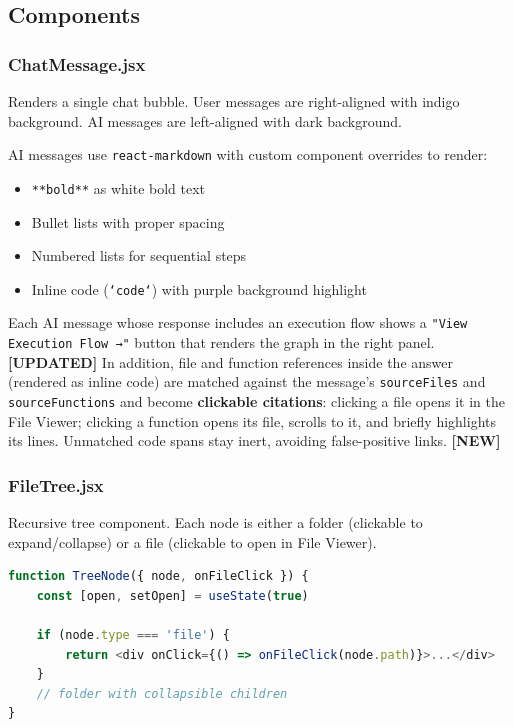 \documentclass[a4paper,11pt]{article}
\begin{document}
\subsection{Components}

\subsubsection{ChatMessage.jsx}
Renders a single chat bubble. User messages are right-aligned with indigo background. AI messages are left-aligned with dark background.

AI messages use \texttt{react-markdown} with custom component overrides to render:
\begin{itemize}
    \item \texttt{**bold**} as white bold text
    \item Bullet lists with proper spacing
    \item Numbered lists for sequential steps
    \item Inline code (\texttt{`code`}) with purple background highlight
\end{itemize}

Each AI message whose response includes an execution flow shows a \texttt{"View Execution Flow →"} button that renders the graph in the right panel. \textbf{[UPDATED]} In addition, file and function references inside the answer (rendered as inline code) are matched against the message's \texttt{sourceFiles} and \texttt{sourceFunctions} and become \textbf{clickable citations}: clicking a file opens it in the File Viewer; clicking a function opens its file, scrolls to it, and briefly highlights its lines. Unmatched code spans stay inert, avoiding false-positive links. \textbf{[NEW]}

\subsubsection{FileTree.jsx}
Recursive tree component. Each node is either a folder (clickable to expand/collapse) or a file (clickable to open in File Viewer).

\begin{lstlisting}[language=JavaScript]
function TreeNode({ node, onFileClick }) {
    const [open, setOpen] = useState(true)
    
    if (node.type === 'file') {
        return <div onClick={() => onFileClick(node.path)}>...</div>
    }
    // folder with collapsible children
}
\end{lstlisting}
\end{document}
